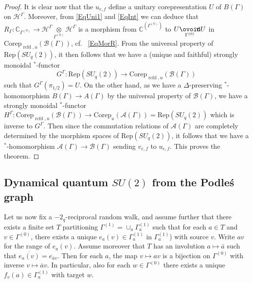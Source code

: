 \documentclass[10pt]{article}
\DeclareMathOperator{\rcf}{\mathrm{rcfd}}
\newcommand{\Corep}{\mathrm{Corep}}
\newcommand{\Circtv}[1]{\underset{#1}{\mathop{\ooalign{$\ovoid$\cr\hidewidth\raise-.05ex\hbox{$\scriptstyle\mathsf T\mkern3.5mu$}\cr}}}} %
\newcommand{\C}{\mathbb{C}}
\newcommand{\Hsp}{\mathcal{H}}
\newcommand{\Rep}{\mathrm{Rep}}
\theoremstyle{definition}
\numberwithin{equation}{section}
\begin{document}
\begin{proof}
It is clear now that the $u_{e,f}$ define a unitary corepresentation $U$ of $B(\Gamma)$ on $\Hsp^{\Gamma}$. Moreover, from \eqref{EqUni1} and \eqref{EqInt} we can deduce that $R_{\Gamma}: \C_{\Gamma^{(0)}}\rightarrow \Hsp^{\Gamma}\underset{\Gamma^{(0)}}{\otimes}\Hsp^{\Gamma}$ is a morphism from $\C^{(\Gamma^{(0)})}$ to $U\Circtv{\Gamma^{(0)}} U$ in $\Corep_{\rcf,u}(\mathscr{B}(\Gamma))$, cf.~ \eqref{EqMorR}. From the universal property of $\Rep(SU_q(2))$, it then follows that we have a (unique and faithful) strongly monoidal $^*$-functor \[G^{\Gamma}: \Rep(SU_q(2)) \rightarrow \Corep_{\rcf,u}(\mathscr{B}(\Gamma))\] such that $G^{\Gamma}(\pi_{1/2}) = U$. On the other hand, as we have a $\Delta$-preserving $^*$-homomorphism $B(\Gamma)\rightarrow A(\Gamma)$ by the universal property of $\mathscr{B}(\Gamma)$, we have a strongly monoidal $^*$-functor $H^{\Gamma}:  \Corep_{\rcf,u}(\mathscr{B}(\Gamma))\rightarrow \Corep_u(\mathscr{A}(\Gamma)) = \Rep(SU_q(2))$ which is inverse to $G^{\Gamma}$. Then since the commutation relations of $\mathscr{A}(\Gamma)$ are completely determined by the morphism spaces of $\Rep(SU_q(2))$, it follows that we have a $^*$-homomorphism $\mathscr{A}(\Gamma)\rightarrow \mathscr{B}(\Gamma)$ sending $v_{e,f}$ to $u_{e,f}$. This proves the theorem. 
\end{proof}

\subsection{Dynamical quantum $SU(2)$ from the Podle\'{s} graph}


Let us now fix a $-2_q$-reciprocal random walk, and assume further that there exists a finite set $T$ partitioning $\Gamma^{(1)} = \cup_a \Gamma^{(1)}_a$ such that for each $a\in T$ and $v\in \Gamma^{(0)}$, there exists a unique $e_a(v)\in \Gamma^{(1)}_a$ in $\Gamma^{(1)}_a$) with source $v$. Write $av$ for the range of $e_a(v)$. Assume moreover that $T$ has an involution $a\mapsto \bar{a}$ such that $\overline{e_a(v)} = e_{\bar{a}v}$. Then for each $a$, the map $v\mapsto av$ is a bijection on $\Gamma^{(0)}$ with inverse $v\mapsto \bar{a}v$. In particular, also for each $w\in \Gamma^{(0)}$ there exists a unique $f_v(a) \in \Gamma^{(1)}_a$ with target $w$.
\end{document}
